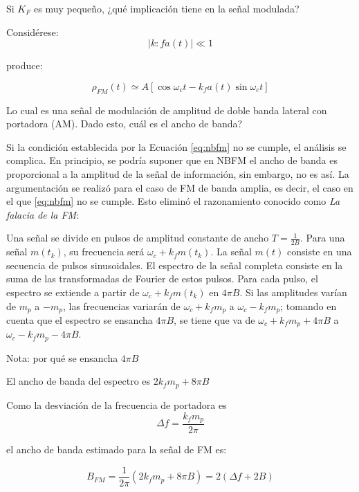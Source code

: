 \documentclass[12pt,letterpaper,titlepage,twoside]{book}
\begin{document}
Si $K_F$ es muy pequeño, ¿qué implicación tiene en la señal modulada?

Considérese:
\begin{equation}
\vert k:f a(t) \vert \ll 1 \label{eq:nbfm}
\end{equation}

produce:

\begin{equation}
\rho_{FM}\left( t \right)  \simeq  A \left[ \cos \omega_c t  - k_f a\left( t \right) \sin \omega_c t  \right]
\end{equation}

Lo cual es una señal de modulación de amplitud de doble banda lateral con portadora (AM). Dado esto, cuál es el ancho de banda?


Si la condición establecida por la Ecuación \ref{eq:nbfm} no se cumple, el análisis se complica. En principio, se podría suponer que en NBFM el ancho de banda es proporcional a la amplitud de la señal de información, sin embargo, no es así. La argumentación se realizó para el caso de FM de banda amplia, es decir, el caso en el que \ref{eq:nbfm} no se cumple. Esto eliminó el razonamiento conocido como \emph{La falacia de la FM}:

Una señal se divide en pulsos de amplitud constante de ancho $T = \frac{1}{2B}$. Para una señal $m(t_k)$, su frecuencia será $\omega_c + k_f m(t_k)$. La señal $m(t)$ consiste en una secuencia de pulsos sinusoidales. El espectro de la señal completa consiste en la suma de las transformadas de Fourier de estos pulsos. Para cada pulso, el espectro se extiende a partir de $\omega_c+k_f m(t_k)$ en $4 \pi B$. Si las amplitudes varían de $m_p$ a $-m_p$, las frecuencias variarán de $\omega_c+k_f m_p$ a $\omega_c-k_f m_p$; tomando en cuenta que el espectro se ensancha $4\pi B$, se tiene que va de $\omega_c+k_f m_p+4\pi B$ a $\omega_c-k_f m_p-4\pi B$.

Nota: por qué se ensancha $4\pi B$

El ancho de banda del espectro es $2 k_f m_p+8\pi B$

Como la desviación de la frecuencia de portadora es
\begin{equation}
\Delta f = \frac{k_f m_p}{2 \pi}
\end{equation}

el ancho de banda estimado para la señal de FM es:

\begin{equation}
B_{FM} = \frac{1}{2\pi} \left( 2k_f m_p+8\pi B\right) = 2 \left( \Delta f + 2B \right)
\end{equation}
\end{document}
